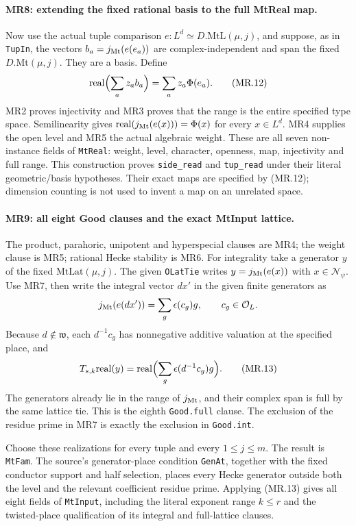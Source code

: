\paragraph{MR8: extending the fixed rational basis to the full MtReal map.}
Now use the actual tuple comparison
$e:L^d\simeq D.\mathrm{MtL}(\mu,j)$, and suppose, as in
\texttt{TupIn}, the vectors
$b_a=j_{\rm Mt}(e(e_a))$ are complex-independent and span the fixed
$D.\mathrm{Mt}(\mu,j)$. They are a basis. Define
\[
 \mathrm{real}\Bigl(\sum_a z_a b_a\Bigr)
             =\sum_a z_a\Phi(e_a).                  \tag{MR.12}
\]
MR2 proves injectivity and MR3 proves that the range is the entire
specified type space. Semilinearity gives
$\mathrm{real}(j_{\rm Mt}(e(x)))=\Phi(x)$ for every $x\in L^d$.
MR4 supplies the open level and MR5 the actual algebraic weight.
These are all seven non-instance fields of \texttt{MtReal}:
weight, level, character, openness, map, injectivity and full range.
This construction proves \texttt{side\_read} and \texttt{tup\_read}
under their literal geometric/basis hypotheses. Their exact maps
are specified by (MR.12); dimension counting is not used to invent
a map on an unrelated space.

\paragraph{MR9: all eight Good clauses and the exact MtInput lattice.}
The product, parahoric, unipotent and hyperspecial clauses are MR4;
the weight clause is MR5; rational Hecke stability is MR6.
For integrality take a generator $y$ of the fixed
$\mathrm{MtLat}(\mu,j)$. The given \texttt{OLatTie} writes
$y=j_{\rm Mt}(e(x))$ with $x\in\mathcal N_{\psi}$.
Use MR7, then write the integral vector $dx'$ in the given finite
generators as
\[
 j_{\rm Mt}(e(dx'))=\sum_g\epsilon(c_g)g,
       \qquad c_g\in\mathcal O_L.
\]
Because $d\notin\mathfrak w$, each $d^{-1}c_g$ has nonnegative
additive valuation at the specified place, and
\[
      T_{s,k}\mathrm{real}(y)
        =\mathrm{real}\Bigl(\sum_g\epsilon(d^{-1}c_g)g\Bigr).
                                                               \tag{MR.13}
\]
The generators already lie in the range of $j_{\rm Mt}$, and their
complex span is full by the same lattice tie. This is the eighth
\texttt{Good.full} clause. The exclusion of the residue prime in
MR7 is exactly the exclusion in \texttt{Good.int}.

Choose these realizations for every tuple and every $1\le j\le m$.
The result is \texttt{MtFam}. The source's generator-place condition
\texttt{GenAt}, together with the fixed conductor support and half
selection, places every Hecke generator outside both the level and
the relevant coefficient residue prime. Applying (MR.13) gives all
eight fields of \texttt{MtInput}, including the literal exponent
range $k\le r$ and the twisted-place qualification of its integral
and full-lattice clauses.

